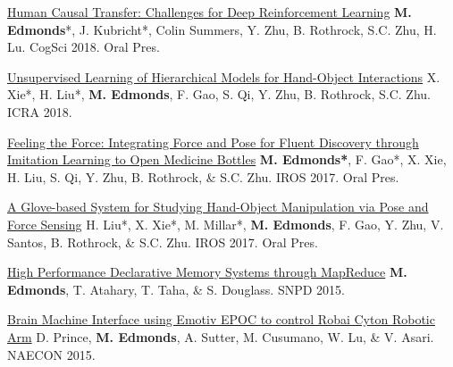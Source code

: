 


\begin{cvpublications}

\item \cvpublication
{\href{http://www.mjedmonds.com/papers/IROS17_OpenBottle_final.pdf}{Human Causal Transfer: Challenges for Deep Reinforcement Learning}} %
{\textbf{M. Edmonds}*, J. Kubricht*, Colin Summers, Y. Zhu, B. Rothrock, S.C. Zhu, H. Lu.} %
{CogSci 2018.} %
{Oral Pres.} %

\item \cvpublication
{\href{http://www.mjedmonds.com/papers/ICRA18_Unsupervised_learning_hierarchical_hoi.pdf}{Unsupervised Learning of Hierarchical Models for Hand-Object Interactions}} %
{X. Xie*, H. Liu*, \textbf{M. Edmonds}, F. Gao, S. Qi, Y. Zhu, B. Rothrock, S.C. Zhu.} %
{ICRA 2018.} %
{} %

\item \cvpublication
{\href{http://www.mjedmonds.com/papers/IROS17_OpenBottle_final.pdf}{Feeling the Force: Integrating Force and Pose for Fluent Discovery through Imitation Learning to Open Medicine Bottles}} %
{\textbf{M. Edmonds*}, F. Gao*, X. Xie, H. Liu, S. Qi, Y. Zhu, B. Rothrock, \& S.C. Zhu.} %
{IROS 2017.} %
{Oral Pres.} %

\item \cvpublication
{\href{http://www.mjedmonds.com/papers/IROS17_GloveHardware_final.pdf}{A Glove-based System for Studying Hand-Object Manipulation via Pose and Force Sensing}} %
{H. Liu*, X. Xie*, M. Millar*, \textbf{M. Edmonds}, F. Gao, Y. Zhu, V. Santos, B. Rothrock, \& S.C. Zhu.} %
{IROS 2017.} %
{Oral Pres.} %

\item \cvpublication
{\href{http://www.mjedmonds.com/papers/SNPD_2015_HighPerformanceDM_final.pdf}{High Performance Declarative Memory Systems through MapReduce}} %
{\textbf{M. Edmonds}, T. Atahary, T. Taha, \& S. Douglass.} %
{SNPD 2015.} %
{} %


\item \cvpublication
{\href{http://www.mjedmonds.com/papers/bmi-using-emotiv.pdf}{Brain Machine Interface using Emotiv EPOC to control Robai Cyton Robotic Arm}} %
{D. Prince, \textbf{M. Edmonds}, A. Sutter, M. Cusumano, W. Lu, \& V. Asari.} %
{NAECON 2015.} %
{} %

\end{cvpublications}